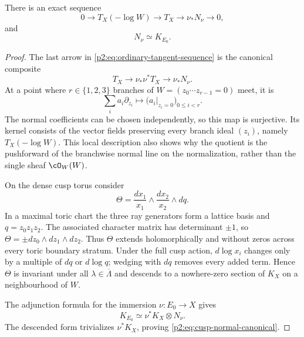 \begin{lemma}
\label{p2:lem:ordinary-tangent-correction}
There is an exact sequence
\begin{equation}
 0\longrightarrow T_X(-\log W)
 \longrightarrow T_X
 \longrightarrow\nu_*N_\nu
 \longrightarrow0,
 \label{p2:eq:ordinary-tangent-sequence}
\end{equation}
and
\begin{equation}
 N_\nu\simeq K_{E_0}.
 \label{p2:eq:cusp-normal-canonical}
\end{equation}
\end{lemma}

\begin{proof}
The last arrow in \eqref{p2:eq:ordinary-tangent-sequence} is the canonical
composite
\[
 T_X\longrightarrow\nu_*\nu^*T_X
 \longrightarrow\nu_*N_\nu.
\]
At a point where $r\in\{1,2,3\}$ branches of
$W=(z_0\cdots z_{r-1}=0)$ meet, it is
\[
 \sum_i a_i\partial_{z_i}
 \longmapsto
 \bigl(a_i|_{z_i=0}\bigr)_{0\le i<r}.
\]
The normal coefficients can be chosen independently, so this map is
surjective.  Its kernel consists of the vector fields preserving every
branch ideal $(z_i)$, namely $T_X(-\log W)$.  This local description also
shows why the quotient is the pushforward of the branchwise normal line on
the normalization, rather than the single sheaf $\cO_W(W)$.

On the dense cusp torus consider
\begin{equation}
 \Theta=
 \frac{dx_1}{x_1}\wedge\frac{dx_2}{x_2}\wedge dq.
 \label{p2:eq:cusp-three-form}
\end{equation}
In a maximal toric chart the three ray generators form a lattice basis and
$q=z_0z_1z_2$.  The associated character matrix has determinant $\pm1$,
so $\Theta=\pm dz_0\wedge dz_1\wedge dz_2$.  Thus $\Theta$ extends
holomorphically and without zeros across every toric boundary stratum.
Under the full cusp action,
$d\log x_i$ changes only by a multiple of $dq$ or $d\log q$; wedging with
$dq$ removes every added term.  Hence $\Theta$ is invariant under all
$\lambda\in\overline\Lambda$ and descends to a nowhere-zero section of
$K_X$ on a neighbourhood of $W$.

The adjunction formula for the immersion $\nu:E_0\to X$ gives
\[
 K_{E_0}\simeq\nu^*K_X\otimes N_\nu.
\]
The descended form trivializes $\nu^*K_X$, proving
\eqref{p2:eq:cusp-normal-canonical}.
\end{proof}